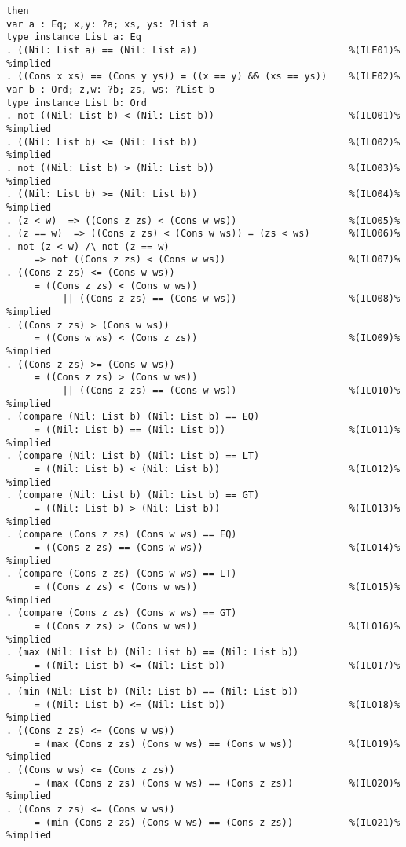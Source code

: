 \begin{Verbatim}
then
var a : Eq; x,y: ?a; xs, ys: ?List a
type instance List a: Eq
. ((Nil: List a) == (Nil: List a))                           %(ILE01)% %implied
. ((Cons x xs) == (Cons y ys)) = ((x == y) && (xs == ys))    %(ILE02)%
var b : Ord; z,w: ?b; zs, ws: ?List b
type instance List b: Ord
. not ((Nil: List b) < (Nil: List b))                        %(ILO01)% %implied
. ((Nil: List b) <= (Nil: List b))                           %(ILO02)% %implied
. not ((Nil: List b) > (Nil: List b))                        %(ILO03)% %implied
. ((Nil: List b) >= (Nil: List b))                           %(ILO04)% %implied
. (z < w)  => ((Cons z zs) < (Cons w ws))                    %(ILO05)%
. (z == w)  => ((Cons z zs) < (Cons w ws)) = (zs < ws)       %(ILO06)%
. not (z < w) /\ not (z == w)                                
     => not ((Cons z zs) < (Cons w ws))                      %(ILO07)%
. ((Cons z zs) <= (Cons w ws))
     = ((Cons z zs) < (Cons w ws)) 
          || ((Cons z zs) == (Cons w ws))                    %(ILO08)% %implied
. ((Cons z zs) > (Cons w ws))
     = ((Cons w ws) < (Cons z zs))                           %(ILO09)% %implied
. ((Cons z zs) >= (Cons w ws))
     = ((Cons z zs) > (Cons w ws)) 
          || ((Cons z zs) == (Cons w ws))                    %(ILO10)% %implied
. (compare (Nil: List b) (Nil: List b) == EQ)
     = ((Nil: List b) == (Nil: List b))                      %(ILO11)% %implied
. (compare (Nil: List b) (Nil: List b) == LT)
     = ((Nil: List b) < (Nil: List b))                       %(ILO12)% %implied
. (compare (Nil: List b) (Nil: List b) == GT)
     = ((Nil: List b) > (Nil: List b))                       %(ILO13)% %implied
. (compare (Cons z zs) (Cons w ws) == EQ)
     = ((Cons z zs) == (Cons w ws))                          %(ILO14)% %implied
. (compare (Cons z zs) (Cons w ws) == LT)
     = ((Cons z zs) < (Cons w ws))                           %(ILO15)% %implied
. (compare (Cons z zs) (Cons w ws) == GT)
     = ((Cons z zs) > (Cons w ws))                           %(ILO16)% %implied
. (max (Nil: List b) (Nil: List b) == (Nil: List b)) 
     = ((Nil: List b) <= (Nil: List b))                      %(ILO17)% %implied
. (min (Nil: List b) (Nil: List b) == (Nil: List b)) 
     = ((Nil: List b) <= (Nil: List b))                      %(ILO18)% %implied
. ((Cons z zs) <= (Cons w ws))
     = (max (Cons z zs) (Cons w ws) == (Cons w ws))          %(ILO19)% %implied
. ((Cons w ws) <= (Cons z zs))
     = (max (Cons z zs) (Cons w ws) == (Cons z zs))          %(ILO20)% %implied
. ((Cons z zs) <= (Cons w ws))
     = (min (Cons z zs) (Cons w ws) == (Cons z zs))          %(ILO21)% %implied

\end{Verbatim}
